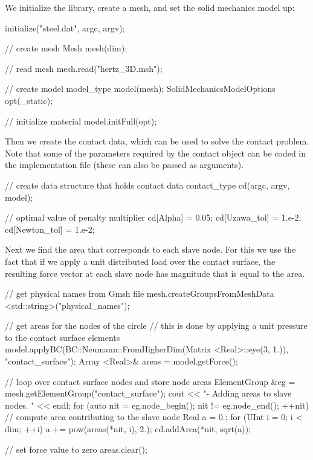 We initialize the library, create a mesh, and set the solid mechanics model up:

\begin{cpp}

  initialize("steel.dat", argc, argv);

  // create mesh
  Mesh mesh(dim);

  // read mesh
  mesh.read("hertz_3D.msh");

  // create model
  model_type model(mesh);
  SolidMechanicsModelOptions opt(_static);

  // initialize material
  model.initFull(opt);
\end{cpp}


Then we create the contact data, which can be used to solve the contact problem. Note that some of the parameters required by the contact object can be coded in the implementation file (these can also be passed as arguments).
\begin{cpp}

  // create data structure that holds contact data
  contact_type cd(argc, argv, model);

  // optimal value of penalty multiplier
  cd[Alpha] = 0.05;
  cd[Uzawa_tol] = 1.e-2;
  cd[Newton_tol] = 1.e-2;
\end{cpp}


Next we find the area that corresponds to each slave node. For this we use the fact that if we apply a unit distributed load over the contact surface, the resulting force vector at each slave node has magnitude that is equal to the area.
\begin{cpp}

  // get physical names from Gmsh file
  mesh.createGroupsFromMeshData <std::string>("physical_names");

  // get areas for the nodes of the circle
  // this is done by applying a unit pressure to the contact surface elements
  model.applyBC(BC::Neumann::FromHigherDim(Matrix <Real>::eye(3, 1.)), "contact_surface");
  Array <Real>& areas = model.getForce();

  // loop over contact surface nodes and store node areas
  ElementGroup &eg = mesh.getElementGroup("contact_surface");
  cout << "- Adding areas to slave nodes. " << endl;
  for (auto nit = eg.node_begin(); nit != eg.node_end(); ++nit) {
    // compute area contributing to the slave node
    Real a = 0.;
    for (UInt i = 0; i < dim; ++i)
      a += pow(areas(*nit, i), 2.);
    cd.addArea(*nit, sqrt(a));
  }

  // set force value to zero
  areas.clear();
\end{cpp}

